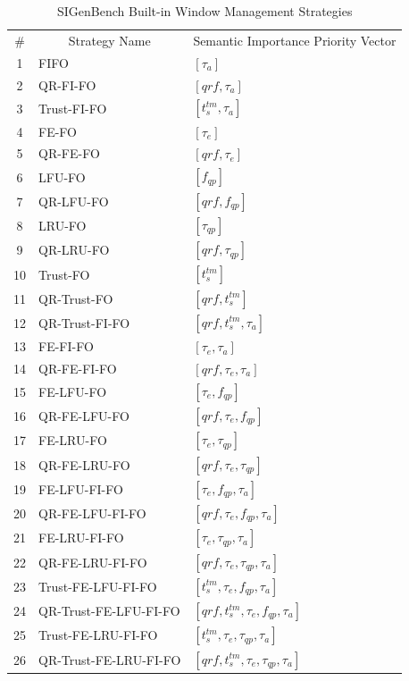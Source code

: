 \begin{table}[!htbp]
	\centering
    \caption{SIGenBench Built-in Window Management Strategies}
    \label{tab:6-26s}
    \begin{tabular}{|c||l|l|} \hline
         \# & \multicolumn{1}{c|}{Strategy Name} & \multicolumn{1}{c|}{Semantic Importance Priority Vector} \\ \hhline{|=#=|=|}
         1 & FIFO & $[\tau_{a}]$ \\ \hline
         2 & QR-FI-FO & $[qrf, \tau_{a}]$ \\ \hline 
         3 & Trust-FI-FO & $[t^{tm}_{s}, \tau_{a}]$ \\ \hline
         4 & FE-FO & $[\tau_{e}]$ \\ \hline
         5 & QR-FE-FO & $[qrf, \tau_{e}]$ \\ \hline
         6 & LFU-FO & $[f_{qp}]$ \\ \hline
         7 & QR-LFU-FO & $[qrf, f_{qp}]$ \\ \hline
         8 & LRU-FO & $[\tau_{qp}]$ \\ \hline
         9 & QR-LRU-FO & $[qrf, \tau_{qp}]$ \\ \hline
         10 & Trust-FO & $[t^{tm}_{s}]$ \\ \hline 
         11 & QR-Trust-FO & $[qrf, t^{tm}_{s}]$ \\ \hline 
         12 & QR-Trust-FI-FO & $[qrf, t^{tm}_{s}, \tau_{a}]$ \\ \hline
         13 & FE-FI-FO & $[\tau_{e}, \tau_{a}]$ \\ \hline
         14 & QR-FE-FI-FO & $[qrf, \tau_{e}, \tau_{a}]$ \\ \hline
         15 & FE-LFU-FO & $[\tau_{e}, f_{qp}]$ \\ \hline
         16 & QR-FE-LFU-FO & $[qrf, \tau_{e}, f_{qp}]$ \\ \hline
         17 & FE-LRU-FO & $[\tau_{e}, \tau_{qp}]$ \\ \hline
         18 & QR-FE-LRU-FO & $[qrf, \tau_{e}, \tau_{qp}]$ \\ \hline
         19 & FE-LFU-FI-FO & $[\tau_{e}, f_{qp}, \tau_{a}]$ \\ \hline
         20 & QR-FE-LFU-FI-FO & $[qrf, \tau_{e}, f_{qp}, \tau_{a}]$ \\ \hline
         21 & FE-LRU-FI-FO & $[\tau_{e}, \tau_{qp}, \tau_{a}]$ \\ \hline
         22 & QR-FE-LRU-FI-FO & $[qrf, \tau_{e}, \tau_{qp}, \tau_{a}]$ \\ \hline
         23 & Trust-FE-LFU-FI-FO & $[t^{tm}_{s}, \tau_{e}, f_{qp}, \tau_{a}]$ \\ \hline
         24 & QR-Trust-FE-LFU-FI-FO & $[qrf, t^{tm}_{s}, \tau_{e}, f_{qp}, \tau_{a}]$ \\ \hline
         25 & Trust-FE-LRU-FI-FO & $[t^{tm}_{s}, \tau_{e}, \tau_{qp}, \tau_{a}]$ \\ \hline
         26 & QR-Trust-FE-LRU-FI-FO & $[qrf, t^{tm}_{s}, \tau_{e}, \tau_{qp}, \tau_{a}]$ \\ \hline    
    \end{tabular}
\end{table}
